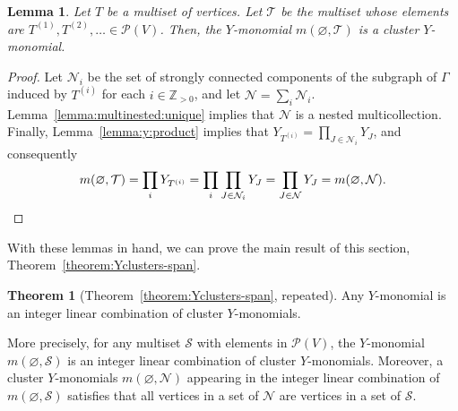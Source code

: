 \documentclass[11pt]{article}
\newtheorem{lemm}[theo]{Lemma}
\theoremstyle{definition}
\newtheorem*{theo*}{Theorem}
\numberwithin{equation}{section}
\newcommand{\positiveintegers}{\mathbb{Z}_{>0}}
\newcommand{\mtp}[1]{^{(#1)}} \newcommand{\graph}{\varGamma}
\newcommand{\vertices}{V}
\newcommand{\powerset}[1]{\mathcal{P}(#1)}
\newcommand{\monomial}[2]{m(#1, #2)}
\begin{document}
\begin{lemm} \label{lemma:multiset:cluster}
    Let \(T\) be a multiset of vertices.
    Let \(\mathcal{T}\) be the multiset whose elements are \(T\mtp{1}, T\mtp{2}, \dots \in \powerset{\vertices}\).
    Then, the \(Y\)-monomial \(\monomial{\varnothing}{\mathcal{T}}\) is a cluster \(Y\)-monomial.
\end{lemm}

\begin{proof}
    Let \(\mathcal{N}_i\) be the set of strongly connected components of the subgraph of \(\graph\) induced by \(T\mtp{i}\) for each \(i \in \positiveintegers\),
    and let \(\mathcal{N} = \sum_i \mathcal{N}_i\).
    Lemma~\ref{lemma:multinested:unique} implies that \(\mathcal{N}\) is a nested multicollection.
    Finally, Lemma~\ref{lemma:y:product} implies that \(Y_{T\mtp{i}} = \prod_{J \in \mathcal{N}_i} Y_J\),
    and consequently
    \begin{equation*}
        \monomial{\varnothing}{\mathcal{T}}
        = \prod_{i} Y_{T\mtp{i}}
        = \prod_{i} \prod_{J \in \mathcal{N}_i} Y_J
        = \prod_{J \in \mathcal{N}} Y_J
        = \monomial{\varnothing}{\mathcal{N}}. \qedhere
    \end{equation*}
\end{proof}

With these lemmas in hand, we can prove the main result of this section, Theorem~\ref{theorem:Yclusters-span}.

\begin{theo*}[Theorem~\ref{theorem:Yclusters-span}, repeated]
    Any \(Y\)-monomial is an integer linear combination of cluster \(Y\)-monomials.

    More precisely, for any multiset \(\mathcal{S}\) with elements in \(\powerset{\vertices}\), the \(Y\)-monomial \(\monomial{\varnothing}{\mathcal{S}}\) is an integer linear combination of cluster \(Y\)-monomials.
    Moreover, a cluster \(Y\)-monomials \(\monomial{\varnothing}{\mathcal{N}}\) appearing in the integer linear combination of \(\monomial{\varnothing}{\mathcal{S}}\) satisfies that all vertices in a set of \(\mathcal{N}\) are vertices in a set of \(\mathcal{S}\).
\end{theo*}
\end{document}
